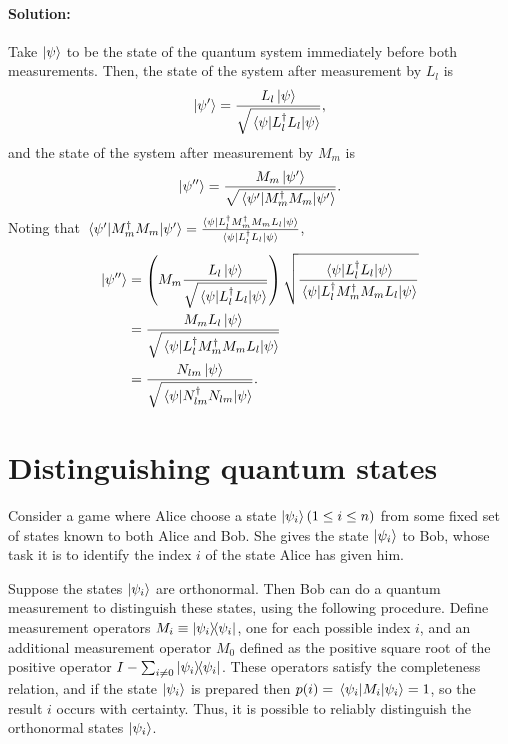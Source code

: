 \paragraph{Solution:} Take $\ket{\psi}$ to be the state of the quantum system
immediately before both measurements. Then, the state of the system after
measurement by $L_l$ is \begin{equation*}
  \ket{\psi'} = \frac{L_l\ket{\psi}}{\sqrt{\mel{\psi}{L_l^\dagger L_l}{\psi}}},
\end{equation*} and the state of the system after measurement by $M_m$ is
\begin{equation*}
  \ket{\psi''} = \frac{M_m\ket{\psi'}}{\sqrt{\mel{\psi'}{M_m^\dagger M_m}
    {\psi'}}}.
\end{equation*}
Noting that $\mel{\psi'}{M_m^\dagger M_m}{\psi'} = \frac{\mel{\psi}{L_l^\dagger
M_m^\dagger M_m L_l}{\psi}}{\mel{\psi}{L_l^\dagger L_l}{\psi}}$,
\begin{align*}
  \ket{\psi''}
  &= \left(M_m\frac{L_l\ket{\psi}}{\sqrt{\mel{\psi}{L_l^\dagger L_l}{\psi}}}
    \right)\sqrt{\frac{\mel{\psi}{L_l^\dagger L_l}{\psi}}{\mel{\psi}{
    L_l^\dagger M_m^\dagger M_m L_l}{\psi}}} \\
  &= \frac{M_mL_l\ket{\psi}}{\sqrt{\mel{\psi}{L_l^\dagger M_m^\dagger M_m L_l}
    {\psi}}} \\
  &= \frac{N_{lm}\ket{\psi}}{\sqrt{\mel{\psi}{N_{lm}^\dagger N_{lm}}{\psi}}}.
\end{align*}

\section{Distinguishing quantum states}

Consider a game where Alice choose a state $\ket{\psi_i} (1 \leq i \leq n)$
from some fixed set of states known to both Alice and Bob. She gives the state
$\ket{\psi_i}$ to Bob, whose task it is to identify the index $i$ of the state
Alice has given him.

Suppose the states $\ket{\psi_i}$ are orthonormal. Then Bob can do a quantum
measurement to distinguish these states, using the following procedure. Define
measurement operators $M_i \equiv \ketbra{\psi_i}{\psi_i}$, one for each
possible index $i$, and an additional measurement operator $M_0$ defined as the
positive square root of the positive operator $I - \sum_{i \neq 0}
\ketbra{\psi_i}{\psi_i}$. These operators satisfy the completeness relation,
and if the state $\ket{\psi_i}$ is prepared then $p(i) = \mel{\psi_i}{M_i}
{\psi_i} = 1$, so the result $i$ occurs with certainty. Thus, it is possible
to reliably distinguish the orthonormal states $\ket{\psi_i}$.

